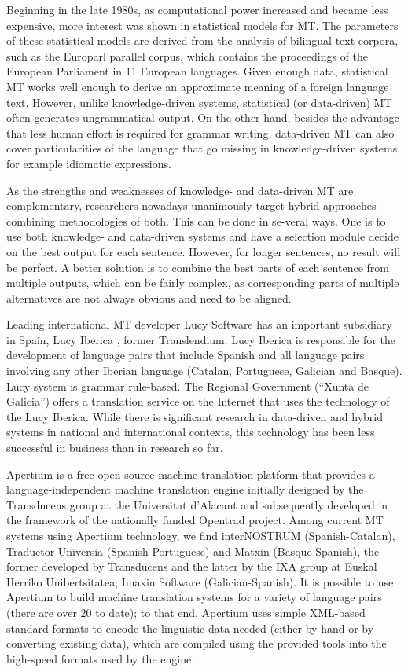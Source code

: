 \begin{multicols}{2}
\begin{itemize}
\begin{multicols}{2}
Beginning in the late 1980s, as computational power increased and became less expensive, more interest was shown in statistical models for MT. The parameters of these statistical models are derived from the analysis of bilingual text \uline{corpora}, such as the Europarl parallel corpus, which contains the proceedings of the European Parliament in 11 European languages. Given enough data, statistical MT works well enough to derive an approximate meaning of a foreign language text. However, unlike knowledge-driven systems, statistical (or data-driven) MT often generates ungrammatical output. On the other hand, besides the advantage that less human effort is required for grammar writing, data-driven MT can also cover particularities of the language that go missing in knowledge-driven systems, for example idiomatic expressions. 

As the strengths and weaknesses of knowledge- and data-driven MT are complementary, researchers nowadays unanimously target hybrid approaches combining methodologies of both. This can be done in se-veral ways. One is to use both knowledge- and data-driven systems and have a selection module decide on the best output for each sentence. However, for longer sentences, no result will be perfect. A better solution is to combine the best parts of each sentence from multiple outputs, which can be fairly complex, as corresponding parts of multiple alternatives are not always obvious and need to be aligned. 

Leading international MT developer Lucy Software has an important subsidiary in Spain, Lucy Iberica \cite{GAL-Nota31}, former Translendium. Lucy Iberica is responsible for the development of language pairs that include Spanish and all language pairs involving any other Iberian language (Catalan, Portuguese, Galician and Basque). Lucy system is grammar rule-based. The Regional Government (“Xunta de Galicia”) \cite{GAL-Nota32} offers a translation service on the Internet that uses the technology of the Lucy Iberica.   While there is significant research in data-driven and hybrid systems in national and international contexts, this technology has been less successful in business than in research so far.

Apertium is a free open-source machine translation platform that provides a language-independent machine translation engine initially designed by the Transducens group at the Universitat d'Alacant and subsequently developed in the framework of the nationally funded Opentrad project. Among current MT systems using Apertium technology, we find interNOSTRUM (Spanish-Catalan), Traductor Universia (Spanish-Portuguese) and Matxin (Basque-Spanish), the former developed by Transducens and the latter by the IXA group \cite{GAL-Nota33} at Euskal Herriko Unibertsitatea, Imaxin Software (Galician-Spanish). It is possible to use Apertium to build machine translation systems for a variety of language pairs (there are over 20 to date); to that end, Apertium uses simple XML-based standard formats to encode the linguistic data needed (either by hand or by converting existing data), which are compiled using the provided tools into the high-speed formats used by the engine.


\end{multicols}
\end{itemize}
\end{multicols}

